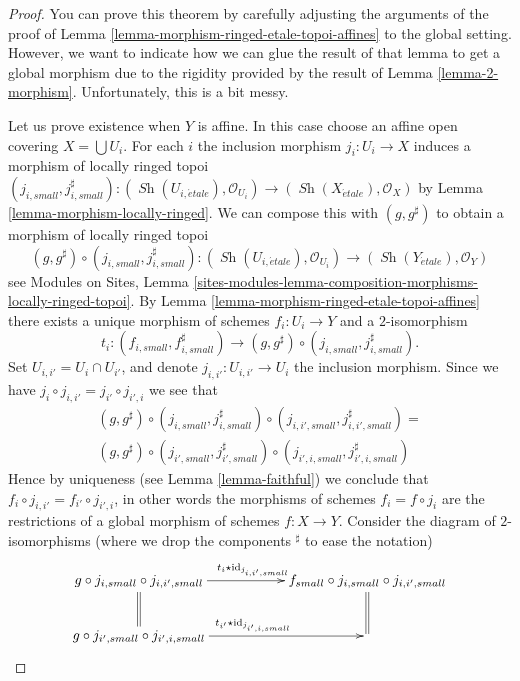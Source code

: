 \documentclass[10pt,a4paper]{amsart}
\theoremstyle{plain}
\theoremstyle{definition}
\theoremstyle{remark}
\numberwithin{equation}{subsection}
\def\Sh{\mathop{\mathit{Sh}}\nolimits}
\def\etale{{\acute{e}tale}}
\begin{document}
\begin{proof}
You can prove this theorem by carefully adjusting the arguments of
the proof of
Lemma \ref{lemma-morphism-ringed-etale-topoi-affines}
to the global setting. However, we want to indicate how we
can glue the result of that lemma to get a global morphism
due to the rigidity provided by the result of
Lemma \ref{lemma-2-morphism}.
Unfortunately, this is a bit messy.

\medskip\noindent
Let us prove existence when $Y$ is affine. In this case choose an
affine open covering $X = \bigcup U_i$. For each $i$ the inclusion
morphism $j_i : U_i \to X$ induces a morphism of locally ringed topoi
$(j_{i, small}, j_{i, small}^\sharp) :
(\Sh(U_{i, \etale}), \mathcal{O}_{U_i})
\to
(\Sh(X_\etale), \mathcal{O}_X)$
by
Lemma \ref{lemma-morphism-locally-ringed}.
We can compose this with $(g, g^\sharp)$ to obtain a morphism
of locally ringed topoi
$$
(g, g^\sharp) \circ (j_{i, small}, j_{i, small}^\sharp) :
(\Sh(U_{i, \etale}), \mathcal{O}_{U_i})
\to
(\Sh(Y_\etale), \mathcal{O}_Y)
$$
see
Modules on Sites,
Lemma \ref{sites-modules-lemma-composition-morphisms-locally-ringed-topoi}.
By
Lemma \ref{lemma-morphism-ringed-etale-topoi-affines}
there exists a unique morphism of schemes $f_i : U_i \to Y$
and a $2$-isomorphism
$$
t_i :
(f_{i, small}, f_{i, small}^\sharp)
\longrightarrow
(g, g^\sharp) \circ (j_{i, small}, j_{i, small}^\sharp).
$$
Set $U_{i, i'} = U_i \cap U_{i'}$, and denote $j_{i, i'} : U_{i, i'} \to U_i$
the inclusion morphism. Since we have
$j_i \circ j_{i, i'} = j_{i'} \circ j_{i', i}$
we see that
\begin{align*}
(g, g^\sharp) \circ
(j_{i, small}, j_{i, small}^\sharp) \circ
(j_{i, i', small}, j_{i, i', small}^\sharp)
= \\
(g, g^\sharp) \circ
(j_{i', small}, j_{i', small}^\sharp) \circ
(j_{i', i, small}, j_{i', i, small}^\sharp)
\end{align*}
Hence by uniqueness (see
Lemma \ref{lemma-faithful})
we conclude that
$f_i \circ j_{i, i'} = f_{i'} \circ j_{i', i}$, in other words the
morphisms of schemes $f_i = f \circ j_i$ are the restrictions of a
global morphism of schemes $f : X \to Y$. Consider the diagram
of $2$-isomorphisms (where we drop the components ${}^\sharp$ to ease the
notation)
$$
\xymatrix{
g \circ j_{i, small} \circ j_{i, i', small}
\ar[rr]^{t_i \star \text{id}_{j_{i, i', small}}}
\ar@{=}[d] & &
f_{small} \circ j_{i, small} \circ j_{i, i', small} \ar@{=}[d] \\
g \circ j_{i', small} \circ j_{i', i, small}
\ar[rr]^{t_{i'} \star \text{id}_{j_{i', i, small}}} & &
}$$
\end{proof}
\end{document}
